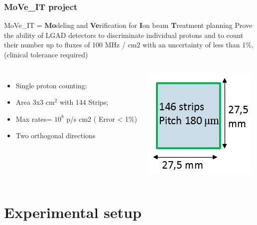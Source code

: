\documentclass[aspectratio=169]{beamer}
\begin{document}
	\begin{frame}
	\frametitle{MoVe\_IT project}
	\begin{center}
		{\color{blue} MoVe\_IT = \textbf{Mo}deling and \textbf{Ve}rification for \textbf{I}on beam \textbf{T}reatment planning }
		\newline
		Prove the ability of LGAD detectors to discriminate individual protons and to count their number up to fluxes of 100 MHz / cm2 with an uncertainty of {\color{blue}less than 1\%}, (clinical tolerance required)
	\end{center}
	\begin{columns}
		\begin{itemize}
			\item Single proton counting:
			\item Area 3x3 cm${}^2$ with 144 Strips;
			\item Max rates= $10^8$ p/s cm2 ({\color{blue} Error < 1\%})
			\item Two orthogonal directions
		\end{itemize}
		\begin{center}
			\includegraphics[width=0.7 \textwidth]{IMG/Detector.PNG}
		\end{center}
	\end{columns}
	\end{frame}
	
\section{Experimental setup}
\end{document}
